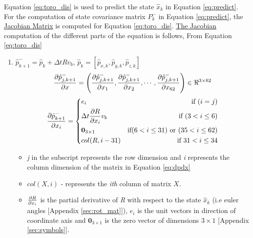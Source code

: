 Equation \ref{eq:toro_dis} is used to predict the state $\hat{x}_k$ in Equation \ref{eq:predict}. For the computation of state covariance matrix $P_k^-$ in Equation \ref{eq:predict}, the \underline{Jacobian Matrix} is computed for Equation \ref{eq:toro_dis}. \underline{The Jacobian} computation of the different parts of the equation is follows,
From Equation \ref{eq:toro_dis}
\begin{enumerate}
\item $ \hat{p}_{k+1}^- = \hat{p}_k + \Delta t Rv_b$, $ \hat{p}_k = [\hat{p}_{x,k},\hat{p}_{y,k},\hat{p}_{z,k}]$
\begin{equation}
\label{eq:dpdx}
\frac{\partial {\hat{p}_{j,k+1}^-}}{\partial {x}} = \left(\frac{\partial {\hat{p}_{j,k+1}^-}}{\partial {x_{1}}}, \frac{\partial {\hat{p}_{j,k+1}^-}}{\partial {x_{2}}}, \cdots , \frac{\partial {\hat{p}_{j,k+1}^-}}{\partial {x_{62}}}\right) \in \Re^{3 \times 62}
\end{equation}
\[
 \frac{\partial {\hat{p}_{k+1}^-}}{\partial {x_{i}}} =  \left\lbrace
  \!\begin{aligned}
   &e_i & \text{if }(i=j)\\
   &\Delta t \frac{\partial {R}}{\partial {x_i}}v_b & \text{if }(3 < i \leq 6)\\
   &\textbf{0}_{3 \times 1} &\text{if}(6 < i \leq 31) \text{ or } (35 < i \leq 62) \\
   &col(R,i-31) & \text{if } 31 < i \leq 34 \\
  \end{aligned} \right.
\]
\begin{itemize}
\item \emph{j} in the subscript represents the row dimension and  \emph{i} represents the column dimension of the matrix in Equation \ref{eq:dpdx}
\item $col(X,i)$ - represents the \emph{ith} column of matrix $X$.
\item $\frac{\partial {R}}{\partial {x_i}}$ is the partial derivative of \emph{R} with respect to the state $\hat{x}_k$ (i.e euler angles [Appendix \ref{sec:rot_mat}]), $e_i$ is the unit vectors in direction of coordinate axis and  $\textbf{0}_{3 \times 1}$ is the zero vector of dimensions $3 \times 1$ [Appendix \ref{sec:symbols}].
\end{itemize}


\end{enumerate}
